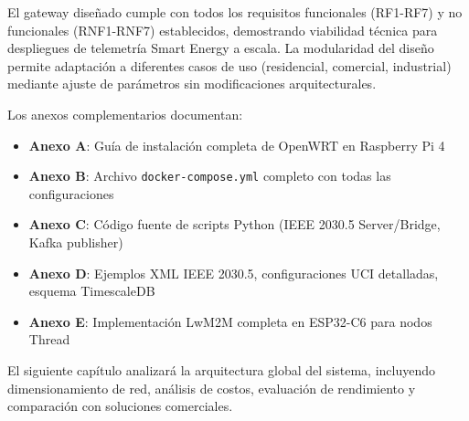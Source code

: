 El gateway diseñado cumple con todos los requisitos funcionales (RF1-RF7) y no funcionales (RNF1-RNF7) establecidos, demostrando viabilidad técnica para despliegues de telemetría Smart Energy a escala. La modularidad del diseño permite adaptación a diferentes casos de uso (residencial, comercial, industrial) mediante ajuste de parámetros sin modificaciones arquitecturales.

Los anexos complementarios documentan:
\begin{itemize}
    \item \textbf{Anexo A}: Guía de instalación completa de OpenWRT en Raspberry Pi 4
    \item \textbf{Anexo B}: Archivo \texttt{docker-compose.yml} completo con todas las configuraciones
    \item \textbf{Anexo C}: Código fuente de scripts Python (IEEE 2030.5 Server/Bridge, Kafka publisher)
    \item \textbf{Anexo D}: Ejemplos XML IEEE 2030.5, configuraciones UCI detalladas, esquema TimescaleDB
    \item \textbf{Anexo E}: Implementación LwM2M completa en ESP32-C6 para nodos Thread
\end{itemize}

El siguiente capítulo analizará la arquitectura global del sistema, incluyendo dimensionamiento de red, análisis de costos, evaluación de rendimiento y comparación con soluciones comerciales.

